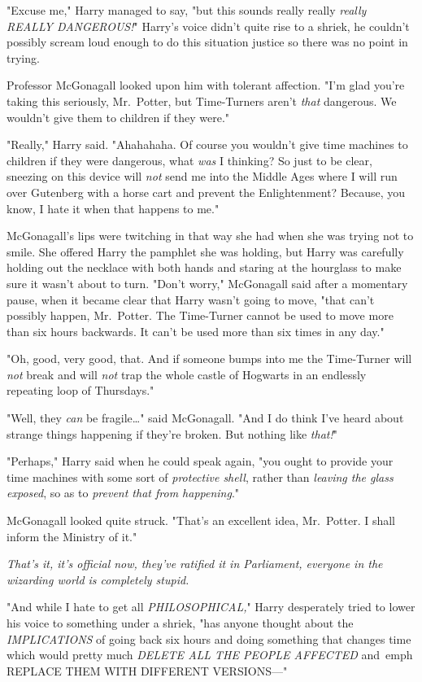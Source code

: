 "Excuse me," Harry managed to say, "but this sounds really really \emph{really 
REALLY DANGEROUS!}" Harry's voice didn't quite rise to a shriek, he couldn't 
possibly scream loud enough to do this situation justice so there was no point 
in trying.

Professor McGonagall looked upon him with tolerant affection. "I'm glad you're 
taking this seriously, Mr.~Potter, but Time-Turners aren't \emph{that} 
dangerous. We wouldn't give them to children if they were."

"Really," Harry said. "Ahahahaha. Of course you wouldn't give time machines to 
children if they were dangerous, what \emph{was} I thinking? So just to be 
clear, sneezing on this device will \emph{not} send me into the Middle Ages 
where I will run over Gutenberg with a horse cart and prevent the 
Enlightenment? Because, you know, I hate it when that happens to me."

McGonagall's lips were twitching in that way she had when she was trying not to 
smile. She offered Harry the pamphlet she was holding, but Harry was carefully 
holding out the necklace with both hands and staring at the hourglass to make 
sure it wasn't about to turn. "Don't worry," McGonagall said after a momentary 
pause, when it became clear that Harry wasn't going to move, "that can't 
possibly happen, Mr.~Potter. The Time-Turner cannot be used to move more than 
six hours backwards. It can't be used more than six times in any day."

"Oh, good, very good, that. And if someone bumps into me the Time-Turner will 
\emph{not} break and will \emph{not} trap the whole castle of Hogwarts in an 
endlessly repeating loop of Thursdays."

"Well, they \emph{can} be fragile{\ldots}" said McGonagall. "And I do think 
I've heard about strange things happening if they're broken. But nothing like 
\emph{that!}"

"Perhaps," Harry said when he could speak again, "you ought to provide your 
time machines with some sort of \emph{protective shell}, rather than 
\emph{leaving the glass exposed}, so as to \emph{prevent that from happening}."

McGonagall looked quite struck. "That's an excellent idea, Mr.~Potter. I shall 
inform the Ministry of it."

\emph{That's it, it's official now, they've ratified it in Parliament, everyone 
in the wizarding world is completely stupid.}

"And while I hate to get all \emph{PHILOSOPHICAL,}" Harry desperately tried to 
lower his voice to something under a shriek, "has anyone thought about the 
\emph{IMPLICATIONS} of going back six hours and doing something that changes 
time which would pretty much \emph{DELETE ALL THE PEOPLE AFFECTED} and\ emph{
REPLACE THEM WITH DIFFERENT VERSIONS---}"

